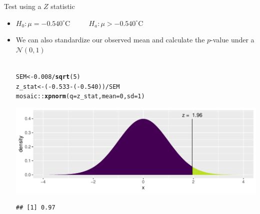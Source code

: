 \documentclass[10pt]{beamer}\usepackage[]{graphicx}\usepackage[]{color}
\makeatletter
\def\maxwidth{ %
  \ifdim\Gin@nat@width>\linewidth
    \linewidth
  \else
    \Gin@nat@width
  \fi
}
\newcommand{\hlnum}[1]{\textcolor[rgb]{0.686,0.059,0.569}{#1}}%
\newcommand{\hlopt}[1]{\textcolor[rgb]{0,0,0}{#1}}%
\newcommand{\hlstd}[1]{\textcolor[rgb]{0.345,0.345,0.345}{#1}}%
\newcommand{\hlkwb}[1]{\textcolor[rgb]{0.69,0.353,0.396}{#1}}%
\newcommand{\hlkwc}[1]{\textcolor[rgb]{0.333,0.667,0.333}{#1}}%
\newcommand{\hlkwd}[1]{\textcolor[rgb]{0.737,0.353,0.396}{\textbf{#1}}}%
\newenvironment{kframe}{%
 \def\at@end@of@kframe{}%
 \ifinner\ifhmode%
  \def\at@end@of@kframe{\end{minipage}}%
  \begin{minipage}{\columnwidth}%
 \fi\fi%
 \def\FrameCommand##1{\hskip\@totalleftmargin \hskip-\fboxsep
 \colorbox{shadecolor}{##1}\hskip-\fboxsep
     \hskip-\linewidth \hskip-\@totalleftmargin \hskip\columnwidth}%
 \MakeFramed {\advance\hsize-\width
   \@totalleftmargin\z@ \linewidth\hsize
   \@setminipage}}%
 {\par\unskip\endMakeFramed%
 \at@end@of@kframe}
\newenvironment{knitrout}{}{} %
\makeatother
\begin{document}
\begin{frame}[fragile]{Test using a $Z$ statistic}
	\begin{itemize}
		\setlength\itemsep{.7em}
		\item   $H_0: \mu =  -0.540^{\circ}$C $\qquad$  $H_a: \mu >  -0.540^{\circ}$C
		
		\item We can also standardize our observed mean and calculate the $p$-value under a $\mathcal{N}(0,1)$ \\ \ \\
		
\begin{knitrout}\tiny
{}\color{fgcolor}\begin{kframe}
\begin{alltt}
\hlstd{SEM} \hlkwb{<-} \hlnum{0.008}\hlopt{/}\hlkwd{sqrt}\hlstd{(}\hlnum{5}\hlstd{)}
\hlstd{z_stat} \hlkwb{<-} \hlstd{(}\hlopt{-}\hlnum{0.533} \hlopt{-} \hlstd{(}\hlopt{-}\hlnum{0.540}\hlstd{))} \hlopt{/} \hlstd{SEM}
\hlstd{mosaic}\hlopt{::}\hlkwd{xpnorm}\hlstd{(}\hlkwc{q} \hlstd{= z_stat,} \hlkwc{mean} \hlstd{=} \hlnum{0}\hlstd{,} \hlkwc{sd} \hlstd{=} \hlnum{1}\hlstd{)}
\end{alltt}


{\ttfamily\noindent\itshape\color{messagecolor}{\#\# }}

{\ttfamily\noindent\itshape{}}

{\ttfamily\noindent\itshape\color{messagecolor}{\#\# 	P(X <= 1.957) = P(Z <= 1.957) = 0.9748}}

{\ttfamily\noindent\itshape\color{messagecolor}{\#\# 	P(X >\ \ 1.957) = P(Z >\ \ 1.957) = 0.0252}}

{\ttfamily\noindent\itshape\color{messagecolor}{\#\# }}\end{kframe}

{\centering \includegraphics[width=\maxwidth]{figure/unnamed-chunk-2-1} 

}


\begin{kframe}\begin{verbatim}
## [1] 0.97
\end{verbatim}
\end{kframe}
\end{knitrout}
		
	\end{itemize}
\end{frame}
\end{document}
